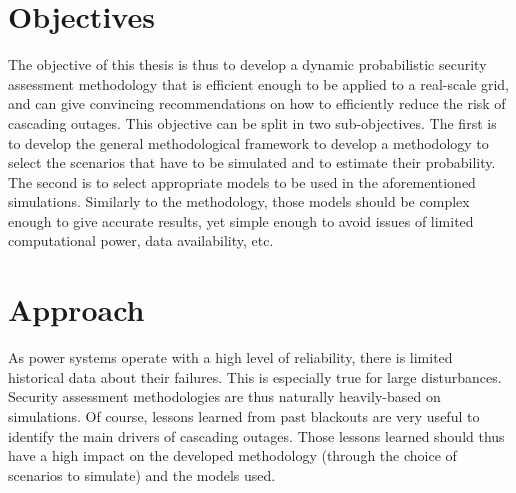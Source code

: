 
\section{Objectives}

The objective of this thesis is thus to develop a dynamic probabilistic security assessment methodology that is efficient enough to be applied to a real-scale grid, and can give convincing recommendations on how to efficiently reduce the risk of cascading outages. This objective can be split in two sub-objectives. The first is to develop the general methodological framework to develop a methodology to select the scenarios that have to be simulated and to estimate their probability. The second is to select appropriate models to be used in the aforementioned simulations. Similarly to the methodology, those models should be complex enough to give accurate results, yet simple enough to avoid issues of limited computational power, data availability, etc.

\section{Approach}

As power systems operate with a high level of reliability, there is limited historical data about their failures. This is especially true for large disturbances. Security assessment methodologies are thus naturally heavily-based on simulations. Of course, lessons learned from past blackouts are very useful to identify the main drivers of cascading outages. Those lessons learned should thus have a high impact on the developed methodology (through the choice of scenarios to simulate) and the models used.


